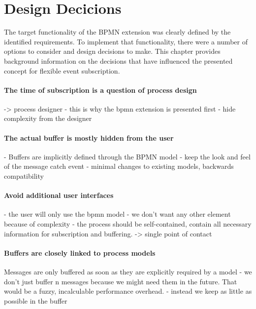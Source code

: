 \section{Design Decicions}\label{ch:designdecisions}

The target functionality of the BPMN extension was clearly defined by the identified requirements.
To implement that functionality, there were a number of options to consider and design decisions to make.
This chapter provides background information on the decisions that have influenced the presented concept for flexible event subscription.


\paragraph{The time of subscription is a question of process design}
-> process designer
- this is why the bpmn extension is presented first
- hide complexity from the designer

\paragraph{The actual buffer is mostly hidden from the user}

- Buffers are implicitly defined through the BPMN model
- keep the look and feel of the message catch event
- minimal changes to existing models, backwards compatibility

\paragraph{Avoid additional user interfaces}
- the user will only use the bpmn model
- we don't want any other element because of complexity
- the process should be self-contained, contain all necessary information for subscription and buffering.
-> single point of contact

\paragraph{Buffers are closely linked to process models}
Messages are only buffered as soon as they are explicitly required by a model
- we don't just buffer n messages because we might need them in the future. That would be a fuzzy, incalculable performance overhead.
- instead we keep as little as possible in the buffer

